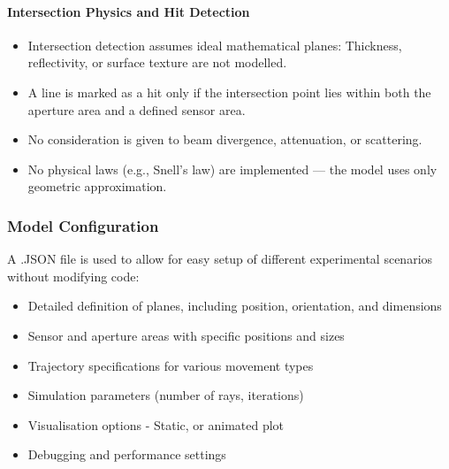 \paragraph{Intersection Physics and Hit Detection}
\begin{itemize}
    \item Intersection detection assumes ideal mathematical planes: Thickness, reflectivity, or surface texture are not modelled.
    \item A line is marked as a hit only if the intersection point lies within both the aperture area and a defined sensor area.
    \item No consideration is given to beam divergence, attenuation, or scattering.
    \item No physical laws (e.g., Snell’s law) are implemented — the model uses only geometric approximation.
\end{itemize}

\subsubsection{Model Configuration}

A .JSON file is used to allow for easy setup of different experimental scenarios without modifying code:

\begin{itemize}
\item Detailed definition of planes, including position, orientation, and dimensions
\item Sensor and aperture areas with specific positions and sizes
\item Trajectory specifications for various movement types
\item Simulation parameters (number of rays, iterations)
\item Visualisation options - Static, or animated plot 
\item Debugging and performance settings
\end{itemize}

